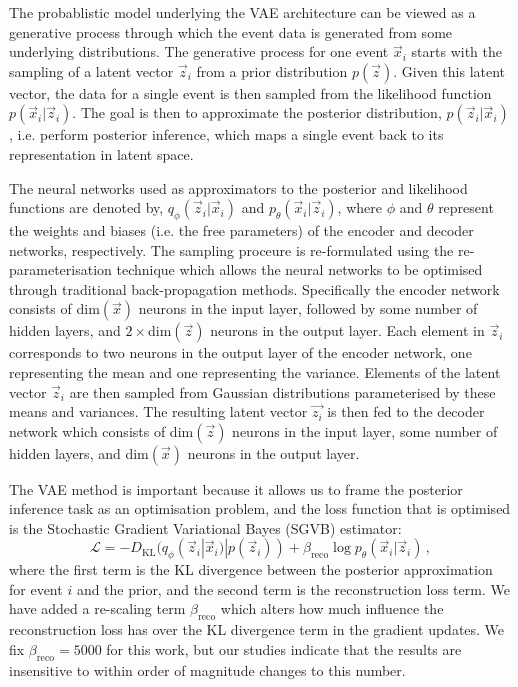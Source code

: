 \documentclass[a4paper,11pt]{article}
\begin{document}
The probablistic model underlying the VAE architecture can be viewed as a generative process through which the event data is generated from some underlying distributions.
The generative process for one event $\vec{x}_i$ starts with the sampling of a latent vector $\vec{z}_i$ from a prior distribution $p(\vec z)$.
Given this latent vector, the data for a single event is then sampled from the likelihood function $p(\vec{x}_i|\vec{z}_i)$.
The goal is then to approximate the posterior distribution, $p(\vec{z}_i|\vec{x}_i)$, i.e. perform posterior inference,  which maps a single event back to its representation in latent space.

The neural networks used as approximators to the posterior and likelihood functions are denoted by, $q_\phi(\vec{z}_i|\vec{x}_i)$ and $p_\theta(\vec{x}_i|\vec{z}_i)$, where $\phi$ and $\theta$ represent the weights and biases (i.e. the free parameters) of the encoder and decoder networks, respectively.
The sampling proceure is re-formulated using the re-parameterisation technique which allows the neural networks to be optimised through traditional back-propagation methods.
Specifically the encoder network consists of dim$(\vec{x})$ neurons in the input layer, followed by some number of hidden layers, and $2\times$dim$(\vec{z})$ neurons in the output layer.
Each element in $\vec{z}_i$ corresponds to two neurons in the output layer of the encoder network, one representing the mean and one representing the variance.
Elements of the latent vector $\vec{z}_i$ are then sampled from Gaussian distributions parameterised by these means and variances.
The resulting latent vector $\vec{z_i}$ is then fed to the decoder network which consists of dim$(\vec{z})$ neurons in the input layer, some number of hidden layers, and dim$(\vec{x})$ neurons in the output layer.

The VAE method is important because it allows us to frame the posterior inference task as an optimisation problem, and the loss function that is optimised is the Stochastic Gradient Variational Bayes (SGVB) estimator:
\begin{equation}
    \mathcal{L} = -D_\text{KL}(q_\phi(\vec{z}_i|\vec{x}_i)|p(\vec{z}_i)) + \beta_\text{reco}\log p_\theta(\vec{x}_i|\vec{z}_i)\,,
\end{equation}
where the first term is the KL divergence between the posterior approximation for event $i$ and the prior, and the second term is the reconstruction loss term.
We have added a re-scaling term $\beta_\text{reco}$ which alters how much influence the reconstruction loss has over the KL divergence term in the gradient updates.
We fix $\beta_\text{reco}=5000$ for this work, but our studies indicate that the results are insensitive to within order of magnitude changes to this number.
\end{document}
